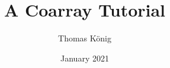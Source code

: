 \documentclass[10pt,a4paper]{article}
\title{A Coarray Tutorial}
\date{January 2021}
\author{Thomas König}
\begin{document}
\maketitle
\begingroup
\let\clearpage\relax

\endgroup
\end{document}
